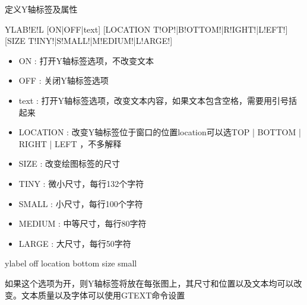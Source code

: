 \label{cmd:ylabel}

定义Y轴标签及属性

\begin{SACSTX}
YLAB!E!L [ON|OFF|text] [LOCATION T!OP!|B!OTTOM!|R!IGHT!|L!EFT!] 
    [SIZE T!INY!|S!MALL!|M!EDIUM!|L!ARGE!]
\end{SACSTX}

\begin{itemize}
\item ON : 打开Y轴标签选项，不改变文本 
\item OFF : 关闭Y轴标签选项 
\item text : 打开Y轴标签选项，改变文本内容，如果文本包含空格，需要用引号括起来
\item LOCATION : 改变Y轴标签位于窗口的位置location可以选TOP | BOTTOM | RIGHT | LEFT ，不多解释
\item SIZE :  改变绘图标签的尺寸 
\item TINY : 微小尺寸，每行132个字符
\item SMALL :  小尺寸，每行100个字符 
\item MEDIUM : 中等尺寸，每行80字符 
\item LARGE : 大尺寸，每行50字符 
\end{itemize}

\begin{SACDFT}
ylabel off location bottom size small
\end{SACDFT}

如果这个选项为开，则Y轴标签将放在每张图上，其尺寸和位置以及文本均可以改变。文本质量以及字体可以使用GTEXT命令设置

